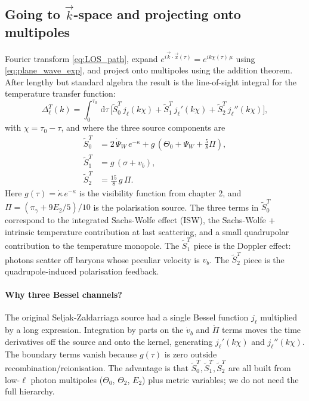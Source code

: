 \subsection{Going to $\vec k$-space and projecting onto multipoles}

Fourier transform \cref{eq:LOS_path}, expand $e^{i\vec k\cdot \vec x(\tau)} = e^{i k\chi(\tau)\,\mu}$ using \cref{eq:plane_wave_exp}, and project onto multipoles using the addition theorem. After lengthy but standard algebra the result is the line-of-sight integral for the temperature transfer function:
\begin{equation}
  \Delta^T_\ell(k) = \int_0^{\tau_0}\,\mathrm{d}\tau\,\bigl[\widetilde S^T_0\, j_\ell(k\chi) + \widetilde S^T_1\, j_\ell'(k\chi) + \widetilde S^T_2\, j_\ell''(k\chi)\bigr],
  \label{eq:Delta_T}
\end{equation}
with $\chi = \tau_0 - \tau$, and where the three source components are
\begin{align}
  \widetilde S^T_0 &= 2\, \dot\Psi_W\, e^{-\kappa} + g\,(\Theta_0 + \Psi_W + \tfrac{5}{8}\Pi), \\
  \widetilde S^T_1 &= g\,(\sigma + v_b), \\
  \widetilde S^T_2 &= \tfrac{15}{8}\, g\, \Pi.
\end{align}
Here $g(\tau) = \dot\kappa\,e^{-\kappa}$ is the visibility function from chapter 2, and $\Pi = (\pi_\gamma + 9 E_2/5)/10$ is the polarisation source. The three terms in $\widetilde S^T_0$ correspond to the integrated Sachs-Wolfe effect (ISW), the Sachs-Wolfe + intrinsic temperature contribution at last scattering, and a small quadrupolar contribution to the temperature monopole. The $\widetilde S^T_1$ piece is the Doppler effect: photons scatter off baryons whose peculiar velocity is $v_b$. The $\widetilde S^T_2$ piece is the quadrupole-induced polarisation feedback.

\paragraph{Why three Bessel channels?}
The original Seljak-Zaldarriaga source had a single Bessel function $j_\ell$ multiplied by a long expression. Integration by parts on the $\dot v_b$ and $\dot\Pi$ terms moves the time derivatives off the source and onto the kernel, generating $j_\ell'(k\chi)$ and $j_\ell''(k\chi)$. The boundary terms vanish because $g(\tau)$ is zero outside recombination/reionisation. The advantage is that $\widetilde S^T_0, \widetilde S^T_1, \widetilde S^T_2$ are all built from low-$\ell$ photon multipoles ($\Theta_0$, $\Theta_2$, $E_2$) plus metric variables; we do not need the full hierarchy.


